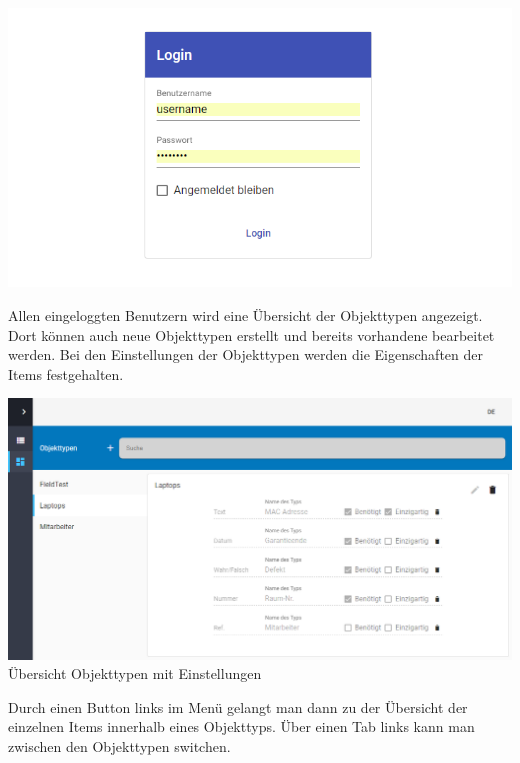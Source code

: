 \documentclass[11pt,a4paper]{report}
\begin{document}
	\begin{center}
		\includegraphics[scale=0.5]{login.png}\\
	\end{center}
	
	Allen eingeloggten Benutzern wird eine Übersicht der Objekttypen angezeigt. 
	Dort können auch neue Objekttypen erstellt und bereits vorhandene bearbeitet werden. 
	Bei den Einstellungen der Objekttypen werden die Eigenschaften der Items festgehalten. \\
	
	\begin{center}
		\includegraphics[scale=0.3]{itemtyp.png}
		\\Übersicht Objekttypen mit Einstellungen
	\end{center}
	
	\newpage
	
	Durch einen Button links im Menü gelangt man dann zu der Übersicht der einzelnen Items innerhalb eines Objekttyps.
	Über einen Tab links kann man zwischen den Objekttypen switchen.\\
		
\end{document}
